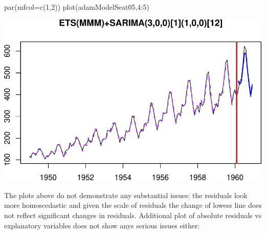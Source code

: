 \documentclass[
]{book}
\newenvironment{Shaded}{\begin{snugshade}}{\end{snugshade}}
\newcommand{\AttributeTok}[1]{\textcolor[rgb]{0.77,0.63,0.00}{#1}}
\newcommand{\ConstantTok}[1]{\textcolor[rgb]{0.00,0.00,0.00}{#1}}
\newcommand{\DecValTok}[1]{\textcolor[rgb]{0.00,0.00,0.81}{#1}}
\newcommand{\FunctionTok}[1]{\textcolor[rgb]{0.00,0.00,0.00}{#1}}
\newcommand{\NormalTok}[1]{#1}
\newcommand{\SpecialCharTok}[1]{\textcolor[rgb]{0.00,0.00,0.00}{#1}}
\theoremstyle{definition}
\theoremstyle{definition}
\theoremstyle{definition}
\theoremstyle{definition}
\theoremstyle{remark}
\begin{document}
\begin{Shaded}
\begin{Highlighting}[]
\FunctionTok{par}\NormalTok{(}\AttributeTok{mfcol=}\FunctionTok{c}\NormalTok{(}\DecValTok{1}\NormalTok{,}\DecValTok{2}\NormalTok{))}
\FunctionTok{plot}\NormalTok{(adamModelSeat05,}\DecValTok{4}\SpecialCharTok{:}\DecValTok{5}\NormalTok{)}
\end{Highlighting}
\end{Shaded}

\includegraphics{adam_files/figure-latex/unnamed-chunk-164-1.pdf}

The plots above do not demonstrate any substantial issues: the residuals look more homoscedastic and given the scale of residuals the change of lowess line does not reflect significant changes in residuals. Additional plot of absolute residuals vs explanatory variables does not show anys serious issues either:

\begin{Shaded}
\end{Shaded}
\end{document}
